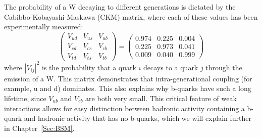 The probability of a W decaying to different generations is dictated by the Cabibbo-Kobayashi-Maskawa (CKM) matrix, where each of these values has been experimentally measured:
\begin{equation}\label{Eq:CKM}
    \left(\begin{array}{c} V_{ud}\\V_{cd}\\V_{td} \end{array}\begin{array}{c}  V_{us}\\V_{cs}\\V_{ts} \end{array}\begin{array}{c} V_{ub}\\V_{cb}\\V_{tb}  \end{array}\right) = \left(\begin{array}{c} 0.974\\0.225\\0.009 \end{array}\begin{array}{c}  0.225\\0.973\\0.040 \end{array}\begin{array}{c} 0.004\\0.041\\0.999  \end{array}\right)
\end{equation}
where $|V_{ij}|^2$ is the probability that a quark $i$ decays to a quark $j$ through the emission of a W. This matrix demonstrates that intra-generational coupling (for example, u and d) dominates. This also explains why b-quarks have such a long lifetime, since $V_{ub}$ and $V_{cb}$ are both very small. This critical feature of weak interactions allows for easy distinction between hadronic activity containing a b-quark and hadronic activity that has no b-quarks, which we will explain further in Chapter~\ref{Sec:BSM}.

